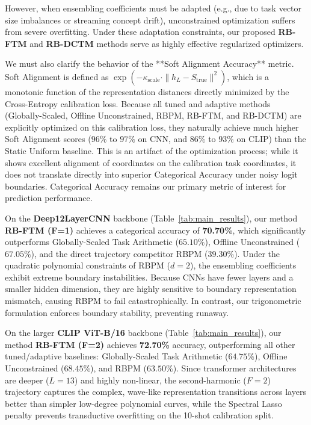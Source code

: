 However, when ensembling coefficients must be adapted (e.g., due to task vector size imbalances or streaming concept drift), unconstrained optimization suffers from severe overfitting. Under these adaptation constraints, our proposed \textbf{RB-FTM} and \textbf{RB-DCTM} methods serve as highly effective regularized optimizers.

We must also clarify the behavior of the **Soft Alignment Accuracy** metric. Soft Alignment is defined as $\exp(-\kappa_{\text{scale}} \cdot \|h_L - S_{\text{true}}\|^2)$, which is a monotonic function of the representation distances directly minimized by the Cross-Entropy calibration loss. Because all tuned and adaptive methods (Globally-Scaled, Offline Unconstrained, RBPM, RB-FTM, and RB-DCTM) are explicitly optimized on this calibration loss, they naturally achieve much higher Soft Alignment scores ($96\%$ to $97\%$ on CNN, and $86\%$ to $93\%$ on CLIP) than the Static Uniform baseline. This is an artifact of the optimization process; while it shows excellent alignment of coordinates on the calibration task coordinates, it does not translate directly into superior Categorical Accuracy under noisy logit boundaries. Categorical Accuracy remains our primary metric of interest for prediction performance.

On the \textbf{Deep12LayerCNN} backbone (Table~\ref{tab:main_results}), our method \textbf{RB-FTM (F=1)} achieves a categorical accuracy of \textbf{70.70\%}, which significantly outperforms Globally-Scaled Task Arithmetic ($65.10\%$), Offline Unconstrained ($67.05\%$), and the direct trajectory competitor RBPM ($39.30\%$). Under the quadratic polynomial constraints of RBPM ($d=2$), the ensembling coefficients exhibit extreme boundary instabilities. Because CNNs have fewer layers and a smaller hidden dimension, they are highly sensitive to boundary representation mismatch, causing RBPM to fail catastrophically. In contrast, our trigonometric formulation enforces boundary stability, preventing runaway.

On the larger \textbf{CLIP ViT-B/16} backbone (Table~\ref{tab:main_results}), our method \textbf{RB-FTM (F=2)} achieves \textbf{72.70\%} accuracy, outperforming all other tuned/adaptive baselines: Globally-Scaled Task Arithmetic ($64.75\%$), Offline Unconstrained ($68.45\%$), and RBPM ($63.50\%$). Since transformer architectures are deeper ($L=13$) and highly non-linear, the second-harmonic ($F=2$) trajectory captures the complex, wave-like representation transitions across layers better than simpler low-degree polynomial curves, while the Spectral Lasso penalty prevents transductive overfitting on the 10-shot calibration split.

